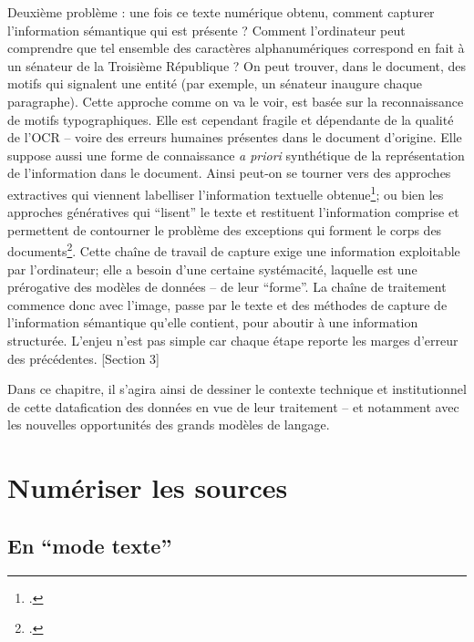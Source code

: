Deuxième problème : une fois ce texte numérique obtenu, comment capturer l'information sémantique qui est présente ? Comment l'ordinateur peut comprendre que tel ensemble des caractères alphanumériques correspond en fait à un sénateur de la Troisième République ? On peut trouver, dans le document, des motifs qui signalent une entité (par exemple, un sénateur inaugure chaque paragraphe). Cette approche comme on va le voir, est basée sur la reconnaissance de motifs typographiques. Elle est cependant fragile et dépendante de la qualité de l'OCR -- voire des erreurs humaines présentes dans le document d'origine. Elle suppose aussi une forme de connaissance \emph{a priori} synthétique de la représentation de l'information dans le document. Ainsi peut-on se tourner vers des approches extractives qui viennent labelliser l'information textuelle obtenue\footcite[][]{finkel}; ou bien les approches génératives qui \enquote{lisent} le texte et restituent l'information comprise et permettent de contourner le problème des exceptions qui forment le corps des documents\footcite[][]{radford}. Cette chaîne de travail de capture exige une information exploitable par l'ordinateur; elle a besoin d'une certaine systémacité, laquelle est une prérogative des modèles de données -- de leur \enquote{forme}. La chaîne de traitement commence donc avec l'image, passe par le texte et des méthodes de capture de l'information sémantique qu'elle contient, pour aboutir à une information structurée. L'enjeu n'est pas simple car chaque étape reporte les marges d'erreur des précédentes. [Section 3]

Dans ce chapitre, il s'agira ainsi de dessiner le contexte technique et institutionnel de cette datafication des données en vue de leur traitement -- et notamment avec les nouvelles opportunités des grands modèles de langage.

\section{Numériser les sources}

\subsection{En \enquote{mode texte}}

